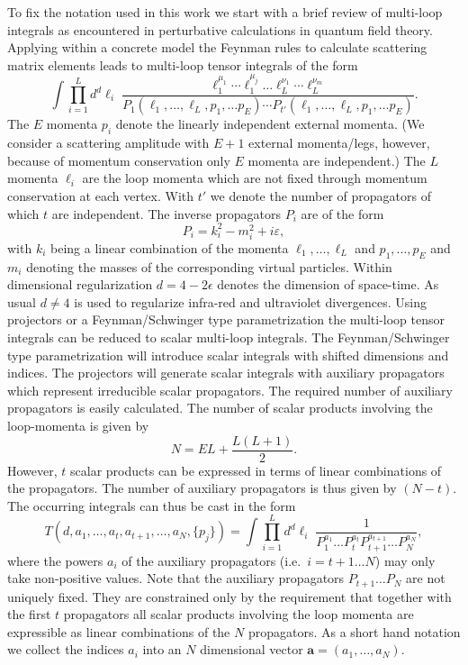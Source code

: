 \documentclass[a4paper,12pt]{scrartcl}
\newcommand*{\bm}{\boldsymbol}
\begin{document}
To fix the notation used in this work we start with a brief review of
multi-loop integrals as encountered in perturbative calculations
in quantum field theory.  Applying within a concrete model the
Feynman rules to calculate scattering matrix elements
leads to multi-loop tensor integrals of the form
\begin{equation}
  \int \prod_{i=1}^L d^d\ell_i\;
  \frac{\ell_1^{\mu_1}\cdots \ell_1^{\mu_j}\ldots
        \ell_L^{\nu_1}\cdots \ell_L^{\nu_m}}
       {P_1(\ell_1,\ldots,\ell_L,p_1,\ldots p_E) \cdots
        P_{t'}(\ell_1,\ldots,\ell_L,p_1,\ldots p_E)}.
\end{equation}
The $E$ momenta $p_i$ denote the linearly independent external
momenta. (We consider a scattering amplitude with $E+1$ external
momenta/legs, however, because of momentum conservation only $E$
momenta are independent.)  The $L$ momenta $\ell_i$ are the loop
momenta which are not fixed through momentum conservation at each
vertex. With $t'$ we denote the number of propagators of which $t$ are
independent.  The inverse propagators $P_i$ are of the form
\begin{equation}
  P_i = k_i^2 - m_i^2 + i\varepsilon,
\end{equation}
with $k_i$ being a linear combination of the momenta
$\ell_1,\ldots,\ell_L$ and $p_1,\ldots, p_E$ and $m_i$ denoting the
masses of the corresponding virtual particles. Within dimensional
regularization $d=4-2\epsilon$ denotes the dimension of space-time. As
usual $d\not=4$ is used to regularize infra-red and ultraviolet
divergences.  Using projectors or a Feynman/Schwinger type
parametrization the multi-loop tensor integrals can be reduced to
scalar multi-loop integrals. The Feynman/Schwinger type
parametrization will introduce scalar integrals with shifted
dimensions and indices. The projectors will generate scalar integrals
with auxiliary propagators which represent irreducible scalar
propagators.
The required number of auxiliary propagators is
easily calculated. The number of scalar products involving the
loop-momenta is given by
\begin{equation}
  N = EL + \frac{L(L+1)}{2}.
\end{equation}
However, $t$ scalar products can be expressed in terms of linear combinations
of the propagators. The number of auxiliary propagators is thus given
by $(N-t)$. The occurring integrals can thus be cast in the form
\begin{equation}
  \label{eq:NotationIntegrals}
  T(d,a_1,\ldots,a_t,a_{t+1},\ldots, a_{N},\{p_j\}) =
  \int\prod_{i=1}^L d^d\ell_i\;
  \frac{1}{P_1^{a_1} \ldots P_t^{a_t} P_{t+1}^{a_{t+1}}\ldots P_N^{a_{N}}},
\end{equation}
where the powers $a_i$ of the auxiliary propagators (i.e.\ $i=t+1\ldots N$)
may only take non-positive values. Note that the
auxiliary propagators $P_{t+1}\ldots P_N$ are not uniquely fixed. They
are constrained only by the requirement that together with the first $t$
propagators all scalar products involving the loop momenta are
expressible as linear combinations of the $N$ propagators. As a short 
hand notation we collect the indices $a_i$ into an $N$
dimensional vector $\bm{a}=(a_1,\ldots,a_N)$.
\end{document}
